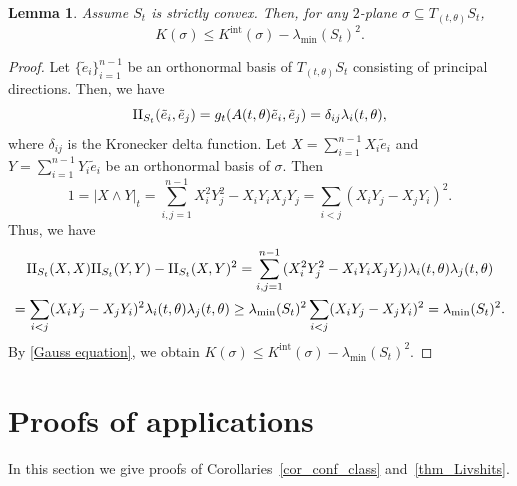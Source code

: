 \documentclass[10pt]{amsart}
\newcommand{\Int}{\mathrm{int}}
\newtheorem{lemma}[theorem]{Lemma}
\theoremstyle{definition}
\newcommand{\RomanNumeralCaps}[1]
{\MakeUppercase{\romannumeral #1}}
\newcommand{\II}{\textup{\RomanNumeralCaps{2}}}
\renewcommand{\>}{{\rangle}}
\newcommand{\<}{{\langle}}
\begin{document}
\begin{lemma}\label{lem: bound_level_curv}
Assume $S_t$ is strictly convex. Then, for any $2$-plane $\sigma\subseteq T_{(t,\theta)}S_t$,
\[
K(\sigma)\leq K^{\Int}(\sigma)-\lambda_{\min}(S_t)^2.
\]
\end{lemma}
\begin{proof}
Let $\{\tilde{e}_i\}_{i=1}^{n-1}$ be an orthonormal basis of $T_{(t,\theta)}S_t$ consisting of principal direc\-tions. Then, we have
\[
\II_{S_t}(\tilde{e}_i, \tilde{e}_j)=g_t(A(t,\theta)\tilde{e}_i, \tilde{e}_j)=\delta_{ij}\lambda_i(t,\theta),
\]
where $\delta_{ij}$ is the Kronecker delta function. Let $X=\sum_{i=1}^{n-1} X_i\tilde{e}_i$ and $Y=\sum_{i=1}^{n-1} Y_i\tilde{e}_i$ be an orthonormal basis of $\sigma$. Then\vspace*{-3pt}
\[
1=|X\wedge Y|_{t}=\sum_{i,j=1}^{n-1}X_i^2 Y_j^2-X_i Y_i X_j Y_j=\sum_{i<j}(X_i Y_j-X_jY_i)^2.
\]
Thus, we have\vspace*{-3pt}
\begin{multline*}
\II_{S_t}(X, X)\II_{S_t}(Y, Y)-\II_{S_t}(X, Y)^2=\sum_{i,j=1}^{n-1}(X_i^2 Y_j^2-X_i Y_i X_j Y_j)\lambda_i(t,\theta)\lambda_j(t,\theta)\\
= \sum_{i<j}(X_i Y_j-X_jY_i)^2\lambda_i(t,\theta)\lambda_j(t,\theta) \geq \lambda_{\min}(S_t)^2\sum_{i<j} (X_i Y_j-X_jY_i)^2=\lambda_{\min}(S_t)^2.
\end{multline*}
By \eqref{Gauss equation}, we obtain $K(\sigma)\leq K^{\Int}(\sigma)-\lambda_{\min}(S_t)^2.$
\end{proof}

\section{Proofs of applications}\label{sec: proof_corollaries}

In this section we give proofs of Corollaries~\ref{cor_conf_class} and~\ref{thm_Livshits}.
\end{document}
